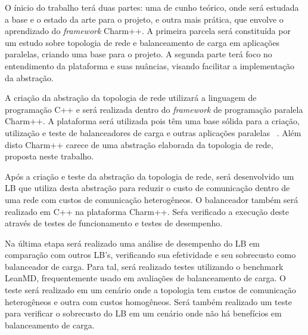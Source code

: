 \documentclass[
	12pt,				%
	openright,			%
	twoside,			%
	a4paper,			%
	english,			%
	brazil,				%
	]{abntex2}
\begin{document}
 
O ínicio do trabalho terá duas partes: uma de cunho teórico, onde será estudada a base e o estado da arte para o projeto, e outra mais prática, que envolve o aprendizado do \textit{framework} Charm++. A primeira parcela será constituída por um estudo sobre topologia de rede e balanceamento de carga em aplicações paralelas, criando uma base para o projeto. A segunda parte terá foco no entendimento da plataforma e suas nuâncias, visando facilitar a implementação da abstração.

A criação da abstração da topologia de rede utilizará a linguagem de programação C++ e será realizada dentro do \textit{framework} de programação paralela Charm++. A plataforma será utilizada pois têm uma base sólida para a criação, utilização e teste de balanceadores de carga e outras aplicações paralelas ~\cite{pilla:CHARM}. Além disto Charm++ carece de uma abstração elaborada da topologia de rede, proposta neste trabalho.

Após a criação e teste da abstração da topologia de rede, será desenvolvido um LB que utiliza desta abstração para reduzir o custo de comunicação dentro de uma rede com custos de comunicação heterogêneos. O balanceador também será realizado em C++ na plataforma Charm++. Seŕa verificado a execução deste através de testes de funcionamento e testes de desempenho.

Na última etapa será realizado uma análise de desempenho do LB em comparação com outros LB's, verificando sua efetividade e seu sobrecusto como balanceador de carga. Para tal, será realizado testes utilizando o benchmark LeanMD, frequentemente usado em avaliações de balanceamento de carga. O teste será realizado em um cenário onde a topologia tem custos de comunicação heterogêneos e outra com custos homogêneos. Será também realizado um teste para verificar o sobrecusto do LB em um cenário onde não há benefícios em balanceamento de carga.




\end{document}

